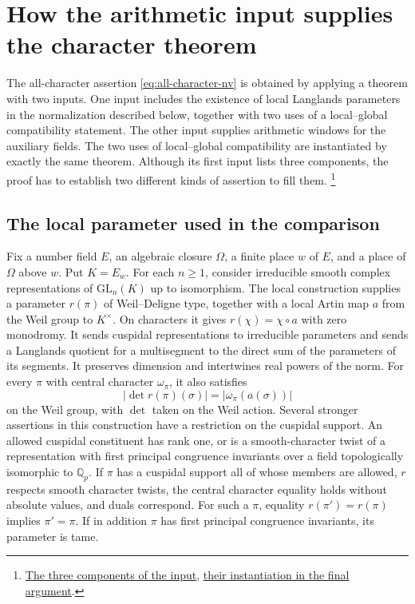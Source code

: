 \section{How the arithmetic input supplies the character theorem}
\label{sec:entry-assembly}

The all-character assertion \eqref{eq:all-character-nv} is obtained by
applying a theorem with two inputs. One input includes the existence of
local Langlands parameters in the normalization described below, together
with two uses of a local--global compatibility statement. The other
input supplies arithmetic windows for the auxiliary fields. The two
uses of local--global compatibility are instantiated by exactly the same
theorem. Although its first input lists three components, the proof
has to establish two different kinds of assertion to fill them.
\footnote{\href{https://github.com/Deicyde/riemann-hypothesis/blob/40e56bab/src/Development/AutomorphicArithmetic/ThetaCorrespondence/ThetaPairLifts/ThirdPlaceSeries/EveryCharacterOfLiteratureOfVWin.lean\#L210-L218}{The three components of the input},
\href{https://github.com/Deicyde/riemann-hypothesis/blob/40e56bab/src/Development/AutomorphicArithmetic/CharacterBoxes/MainConclusion.lean\#L6-L12}{their instantiation in the final argument}.}

\subsection{The local parameter used in the comparison}

Fix a number field \(E\), an algebraic closure \(\Omega\), a finite
place \(w\) of \(E\), and a place of \(\Omega\) above \(w\). Put
\(K=E_w\). For each \(n\ge1\), consider irreducible smooth complex
representations of \(\mathrm{GL}_n(K)\) up to isomorphism. The local
construction supplies a parameter \(r(\pi)\) of Weil--Deligne type,
together with a local Artin map \(a\) from the Weil group to \(K^\times\).
On characters it gives \(r(\chi)=\chi\circ a\) with zero monodromy. It
sends cuspidal representations to irreducible parameters and sends a
Langlands quotient for a multisegment to the direct sum of the parameters
of its segments. It preserves dimension and intertwines real powers of
the norm. For every \(\pi\) with central character \(\omega_\pi\), it
also satisfies
\[
   |\det r(\pi)(\sigma)|=|\omega_\pi(a(\sigma))|
\]
on the Weil group, with \(\det\) taken on the Weil action. Several
stronger assertions in this construction have a restriction on the
cuspidal support. An allowed cuspidal constituent has rank one, or is a
smooth-character twist of a representation with first principal
congruence invariants over a field topologically isomorphic to
\(\mathbb Q_p\). If \(\pi\) has a cuspidal support all of whose members
are allowed, \(r\) respects smooth character twists, the central
character equality holds without absolute values, and duals correspond.
For such a \(\pi\), equality \(r(\pi')=r(\pi)\) implies \(\pi'=\pi\).
If in addition \(\pi\) has first principal congruence invariants, its
parameter is tame.

